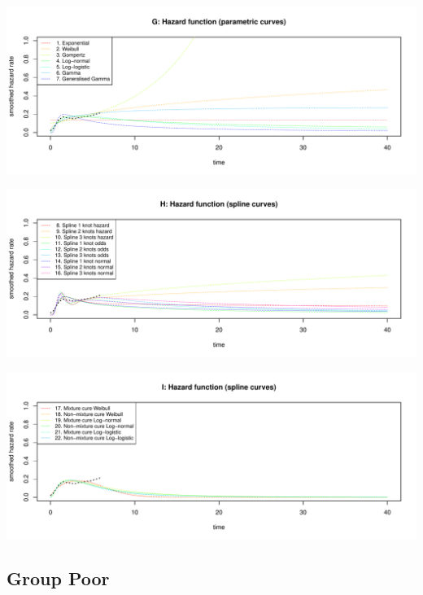 \documentclass[]{article}
\begin{document}
\begin{flushleft}\includegraphics[height=0.29\textheight]{Images/validate_extrapolation2-7} \end{flushleft}

\begin{flushleft}\includegraphics[height=0.29\textheight]{Images/validate_extrapolation2-8} \end{flushleft}

\begin{flushleft}\includegraphics[height=0.29\textheight]{Images/validate_extrapolation2-9} \end{flushleft}

\newpage

\subsection{Group Poor}\label{group-poor}
\end{document}
